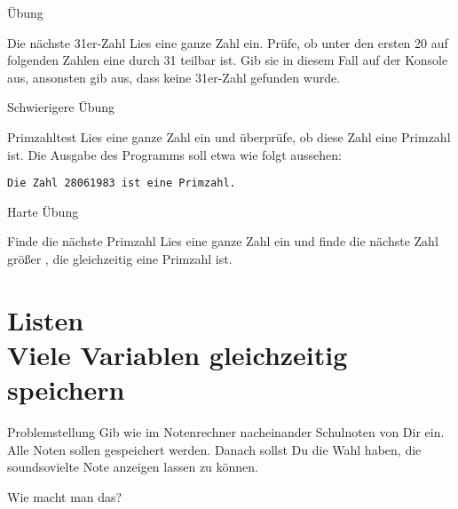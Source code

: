 \begin{frame}{Übung}
	
	\begin{block}{Die nächste 31er-Zahl}
		\vspace{2pt}
		Lies eine ganze Zahl  ein. Prüfe, ob unter den ersten 20 auf  folgenden Zahlen eine durch 31 teilbar ist. Gib sie in diesem Fall auf der Konsole aus, ansonsten gib aus, dass keine 31er-Zahl gefunden wurde.  
	\end{block}	

\end{frame}

\begin{frame}{Schwierigere Übung}
\begin{block}{Primzahltest}
\vspace{2pt}
Lies eine ganze Zahl  ein und überprüfe, ob diese Zahl eine Primzahl ist. Die Ausgabe des Programms soll etwa wie folgt aussehen:  

\texttt{Die Zahl 28061983 ist eine Primzahl.}
\end{block}
\end{frame}

\begin{frame}{Harte Übung}
\begin{block}{Finde die nächste Primzahl}
\vspace{2pt}
Lies eine ganze Zahl  ein und finde die nächste Zahl größer , die gleichzeitig eine Primzahl ist. 
\end{block}
\end{frame}


\section{Listen \\ \footnotesize Viele Variablen gleichzeitig speichern}


\begin{frame}
\begin{block}{Problemstellung}
\vspace{2pt}
Gib wie im Notenrechner nacheinander Schulnoten von Dir ein. 
Alle Noten sollen gespeichert werden. Danach sollst Du die Wahl haben, die soundsovielte Note anzeigen lassen zu können.   

	\vspace{8pt}

Wie macht man das? 
\end{block}
\end{frame}


